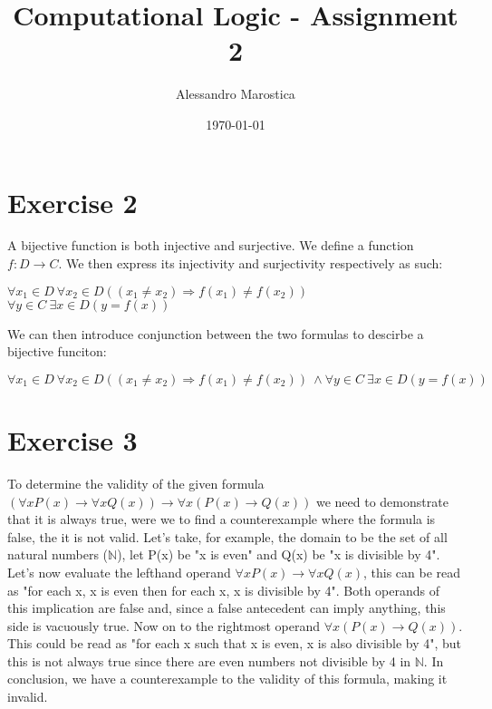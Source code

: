 \documentclass[11pt]{exam}
\title{Computational Logic - Assignment 2}
\author{Alessandro Marostica}
\date{\today}
\begin{document}
\maketitle
\section*{Exercise 2}
A bijective function is both injective and surjective.
We define a function \(f: D \to C\). We then express its injectivity and surjectivity respectively as such:
\begin{center}
    \(\forall x_1 \in D \  \forall x_2 \in D((x_1 \neq x_2) \Longrightarrow f(x_1) \neq f(x_2)) \)
    \\
    \(\forall y \in C \  \exists x \in D(y = f(x))\)
\end{center}
We can then introduce conjunction between the two formulas to descirbe a bijective funciton:
\begin{center}
    \(\forall x_1 \in D \  \forall x_2 \in D((x_1 \neq x_2) \Longrightarrow f(x_1) \neq f(x_2))\ \wedge \forall y \in C \  \exists x \in D(y = f(x))\)
\end{center}
\section*{Exercise 3}
To determine the validity of the given formula \((\forall xP(x) \to \forall xQ(x)) \to \forall x(P(x) \to Q(x))\)
we need to demonstrate that it is always true, were we to find a counterexample where the formula is false, the it is not valid.
Let's take, for example, the domain to be the set of all natural numbers (\(\mathbb{N}\)), let P(x) be "x is even" and Q(x) be "x is divisible by 4".
Let's now evaluate the lefthand operand \(\forall xP(x) \to \forall xQ(x)\), this can be read as "for each x, x is even then for each x, x is divisible by 4".
Both operands of this implication are false and, since a false antecedent can imply anything, this side is vacuously true.
Now on to the rightmost operand \(\forall x(P(x) \to Q(x))\). This could be read as "for each x such that x is even, x is also divisible by 4", but this is not
always true since there are even numbers not divisible by 4 in \(\mathbb{N}\).
In conclusion, we have a counterexample to the validity of this formula, making it invalid.
\end{document}
